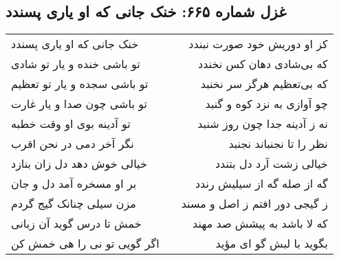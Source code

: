 \begin{center}
\section*{غزل شماره ۶۶۵: خنک جانی که او یاری پسندد}
\label{sec:0665}
\begin{longtable}{l p{0.5cm} r}
خنک جانی که او یاری پسندد
&&
کز او دوریش خود صورت نبندد
\\
تو باشی خنده و یار تو شادی
&&
که بی‌شادی دهان کس نخندد
\\
تو باشی سجده و یار تو تعظیم
&&
که بی‌تعظیم هرگز سر نخنبد
\\
تو باشی چون صدا و یار غارت
&&
چو آوازی به نزد کوه و گنبد
\\
تو آدینه بوی او وقت خطبه
&&
نه ز آدینه جدا چون روز شنبد
\\
نگر آخر دمی در نحن اقرب
&&
نظر را تا نجنباند نجنبد
\\
خیالی خوش دهد دل زان بنازد
&&
خیالی زشت آرد دل بتندد
\\
بر او مسخره آمد دل و جان
&&
گه از صله گه از سیلیش رندد
\\
مزن سیلی چنانک گیج گردم
&&
ز گیجی دور افتم ز اصل و مسند
\\
خمش تا درس گوید آن زبانی
&&
که لا باشد به پیشش صد مهند
\\
اگر گویی تو نی را هی خمش کن
&&
بگوید با لبش گو ای مؤید
\\
\end{longtable}
\end{center}
